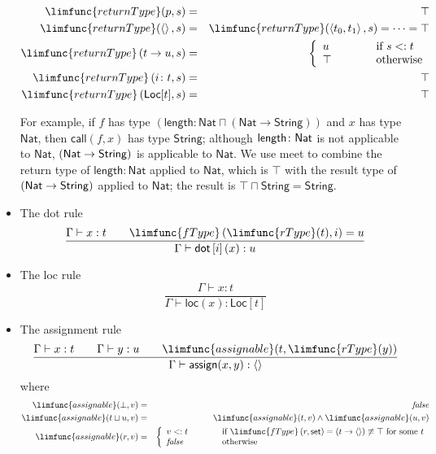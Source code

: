 \documentclass[12pt]{article}
\begin{document}
\begin{itemize}
\begin{eqnarray*}
\limfunc{returnType}(p,s) &=&\top  \\
\limfunc{returnType}(\left\langle {}\right\rangle ,s) &=&\limfunc{returnType}%
(\left\langle t_{0},t_{1}\right\rangle ,s)=\cdots =\top  \\
\limfunc{returnType}\left( t\rightarrow u,s\right)  &=&\left\{ 
\begin{array}{lll}
u & \qquad  & \text{if }s<:t \\ 
\top  &  & \text{otherwise}%
\end{array}%
\right.  \\
\limfunc{returnType}\left( i\colon t,s\right)  &=&\top  \\
\limfunc{returnType}\left( \mathsf{Loc}[t],s\right)  &=&\top 
\end{eqnarray*}

For example, if $f$ has type $\left( \mathsf{length\colon Nat}\sqcap \left( 
\mathsf{Nat\rightarrow String}\right) \right) $ and $x$ has type $\mathsf{Nat%
}$, then $\mathsf{call}(f,x)$ has type $\mathsf{String}$; although $\mathsf{%
length\colon Nat}$ is not applicable to $\mathsf{Nat}$, $\left( \mathsf{%
Nat\rightarrow String}\right) $ is applicable to $\mathsf{Nat}$. We use meet
to combine the return type of $\mathsf{length\colon Nat}$ applied to $%
\mathsf{Nat}$, which is $\top $ with the result type of $\left( \mathsf{%
Nat\rightarrow String}\right) $ applied to $\mathsf{Nat}$; the result is $%
\top \sqcap \mathsf{String}=\mathsf{String}$.

\item The dot rule%
\begin{equation*}
\frac{\Gamma \vdash x:t\qquad \limfunc{fType}\left( \limfunc{rType}%
(t),i\right) =u}{\Gamma \vdash \mathsf{dot}\left[ i\right] (x):u}
\end{equation*}

\item The loc rule%
\begin{equation*}
\frac{\Gamma \vdash x:t}{\Gamma \vdash \mathsf{loc}(x):\mathsf{Loc}[t]}
\end{equation*}

\item The assignment rule%
\begin{equation*}
\frac{\Gamma \vdash x:t\qquad \Gamma \vdash y:u\qquad \limfunc{assignable}(t,%
\limfunc{rType}(y))}{\Gamma \vdash \mathsf{assign}(x,y):\left\langle
{}\right\rangle }
\end{equation*}%
where%
\begin{eqnarray*}
\limfunc{assignable}(\bot ,v) &=&\mathit{false} \\
\limfunc{assignable}(t\sqcup u,v) &=&\limfunc{assignable}(t,v)\wedge 
\limfunc{assignable}(u,v) \\
\limfunc{assignable}(r,v) &=&\left\{ 
\begin{array}{lll}
v<:t & \qquad  & \text{if }\limfunc{fType}\left( r,\mathsf{set}\right)
=\left( t\rightarrow \left\langle {}\right\rangle \right) \not\equiv \top 
\text{ for some }t \\ 
\mathit{false} &  & \text{otherwise}%
\end{array}%
\right. 
\end{eqnarray*}


\end{itemize}
\end{document}
